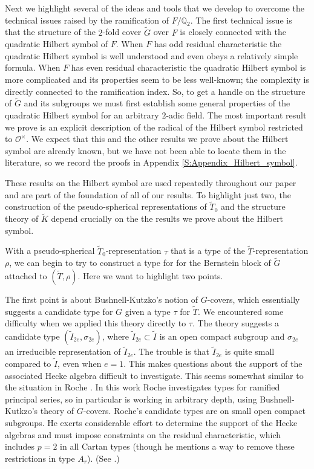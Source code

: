 \documentclass[10pt, letterpaper]{amsart}
\theoremstyle{plain}
\theoremstyle{definition}
\numberwithin{equation}{section}
\newcommand{\Gt}{\widetilde{G}}
\newcommand{\It}{\widetilde{I}}
\newcommand{\Kt}{\widetilde{K}}
\newcommand{\Tt}{\widetilde{T}}
\newcommand{\Ocal}{\mathcal{O}}
\begin{document}
\quad

Next we highlight several of the ideas and tools that we develop to overcome the technical issues raised by the ramification of $F/\mathbb{Q}_{2}$. The first technical issue is that the structure of the $2$-fold cover $\Gt$ over $F$ is closely connected with the quadratic Hilbert symbol of $F$. When $F$ has odd residual characteristic the quadratic Hilbert symbol is well understood and even obeys a relatively simple formula. 
When $F$ has even residual characteristic the quadratic Hilbert symbol is more complicated and its properties seem to be less well-known; the complexity is directly connected to the ramification index. So, to get a handle on the structure of $\Gt$ and its subgroups we must first establish some general properties of the quadratic Hilbert symbol for an arbitrary $2$-adic field. The most important result we prove is an explicit description of the radical of the Hilbert symbol restricted to $\Ocal^{\times}$. We expect that this and the other results we prove about the Hilbert symbol are already known, but we have not been able to locate them in the literature, so we record the proofs in Appendix \ref{S:Appendix_Hilbert_symbol}.

These results on the Hilbert symbol are used repeatedly throughout our paper and are part of the foundation of all of our results. To highlight just two, the construction of the pseudo-spherical representations of $\Tt_{0}$ and the structure theory of $\Kt$ depend crucially on the the results we prove about the Hilbert symbol.

With a pseudo-spherical $\Tt_{0}$-representation $\tau$ that is a type of the $\Tt$-representation $\rho$, we can begin to try to construct a type for for the Bernstein block of $\Gt$ attached to $(\Tt,\rho)$. Here we want to highlight two points. 

The first point is about Bushnell-Kutzko's notion of $G$-covers, which essentially suggests a candidate type for $G$ given a type $\tau$ for $\Tt$. We encountered some difficulty when we applied this theory directly to $\tau$. The theory suggests a candidate type $(\It_{2e},\sigma_{2e})$, where $\It_{2e}\subset \It$ is an open compact subgroup and $\sigma_{2e}$ an irreducible representation of $\It_{2e}$. The trouble is that $\It_{2e}$ is quite small compared to $\It$, even when $e=1$. This makes questions about the support of the associated Hecke algebra difficult to investigate. This seems somewhat similar to the situation in Roche \cite{R98}. In this work Roche investigates types for ramified principal series, so in particular is working in arbitrary depth, using Bushnell-Kutkzo's theory of $G$-covers. Roche's candidate types are on small open compact subgroups. He exerts considerable effort to determine the support of the Hecke algebras and must impose constraints on the residual characteristic, which includes $p=2$ in all Cartan types (though he mentions a way to remove these restrictions in type $A_r$). (See \cite[pg. 370-379]{R98}.)
\end{document}
